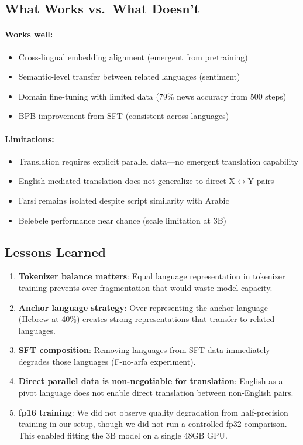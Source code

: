 \documentclass[10pt,twocolumn]{article}
\begin{document}
\subsection{What Works vs.\ What Doesn't}

\paragraph{Works well:}
\begin{itemize}
    \item Cross-lingual embedding alignment (emergent from pretraining)
    \item Semantic-level transfer between related languages (sentiment)
    \item Domain fine-tuning with limited data (79\% news accuracy from 500 steps)
    \item BPB improvement from SFT (consistent across languages)
\end{itemize}

\paragraph{Limitations:}
\begin{itemize}
    \item Translation requires explicit parallel data---no emergent translation capability
    \item English-mediated translation does not generalize to direct X$\leftrightarrow$Y pairs
    \item Farsi remains isolated despite script similarity with Arabic
    \item Belebele performance near chance (scale limitation at 3B)
\end{itemize}

\subsection{Lessons Learned}

\begin{enumerate}
    \item \textbf{Tokenizer balance matters}: Equal language representation in tokenizer training prevents over-fragmentation that would waste model capacity.
    \item \textbf{Anchor language strategy}: Over-representing the anchor language (Hebrew at 40\%) creates strong representations that transfer to related languages.
    \item \textbf{SFT composition}: Removing languages from SFT data immediately degrades those languages (F-no-arfa experiment).
    \item \textbf{Direct parallel data is non-negotiable for translation}: English as a pivot language does not enable direct translation between non-English pairs.
    \item \textbf{fp16 training}: We did not observe quality degradation from half-precision training in our setup, though we did not run a controlled fp32 comparison. This enabled fitting the 3B model on a single 48GB GPU.
\end{enumerate}
\end{document}
